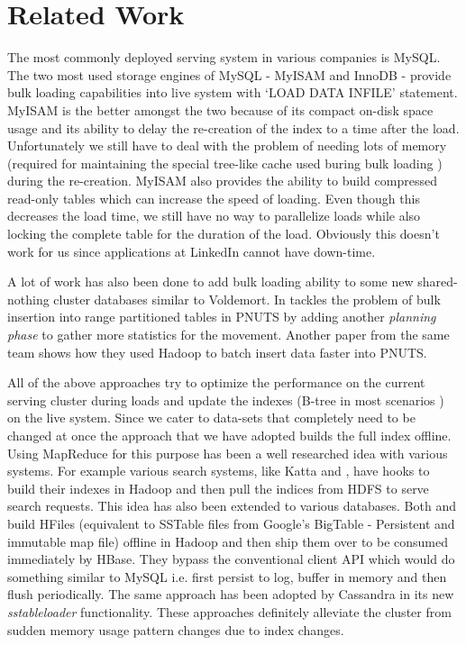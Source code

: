 \documentclass[10pt,twocolumn,preprint,natbib,authoryear]{sigplanconf}
\begin{document}
\section{Related Work}
\label{sec:related_work}
The most commonly deployed serving system in various companies is MySQL. The two most used storage engines of MySQL - MyISAM and InnoDB - provide bulk loading capabilities into live system with `LOAD DATA INFILE' statement. MyISAM is the better amongst the two because of its compact on-disk space usage and its ability to delay the re-creation of the index to a time after the load\cite{bulk}.  Unfortunately we still have to deal with the problem of needing lots of memory (required for maintaining the special tree-like cache used buring bulk loading
) during the re-creation. MyISAM also provides the ability to build compressed read-only tables which can increase the speed of loading. Even though this decreases the load time, we still have no way to parallelize loads while also locking the complete table for the duration of the load. Obviously this doesn't work for us since applications at LinkedIn cannot have down-time. 

A lot of work has also been done to add bulk loading ability to some new shared-nothing cluster\cite{sharednothing} databases similar to Voldemort. In \cite{silberstein} tackles the problem of bulk insertion into range partitioned tables in PNUTS \cite{pnuts} by adding another \emph {planning phase} to gather more statistics for the movement. Another paper from the same team \cite{pnutsbatch} shows how they used Hadoop to batch insert data faster into PNUTS.

All of the above approaches try to optimize the performance on the current serving cluster during loads and update the indexes (B-tree in most scenarios ) on the live system. Since we cater to data-sets that completely need to be changed at once the approach that we have adopted builds the full index offline. Using MapReduce for this purpose has been a well researched idea with various systems. For example various search systems, like Katta\cite{katta} and \cite{mika}, have hooks to build their indexes in Hadoop and then pull the indices from HDFS to serve search requests. This idea has also been extended to various databases. Both \cite{konstantinou} and \cite{barbuzzi} build HFiles (equivalent to SSTable files from Google's BigTable \cite{bigtable} - Persistent and immutable map file) offline in Hadoop and then ship them over to be consumed immediately by HBase\cite{hbase}. They bypass the conventional client API which would do something similar to MySQL i.e. first persist to log, buffer in memory and then flush periodically. The same approach has been adopted by Cassandra\cite{cassandra} in its new \emph{sstableloader}\cite{cassandra_bulk} functionality. These approaches definitely alleviate the cluster from sudden memory usage pattern changes due to index changes. 
\end{document}
